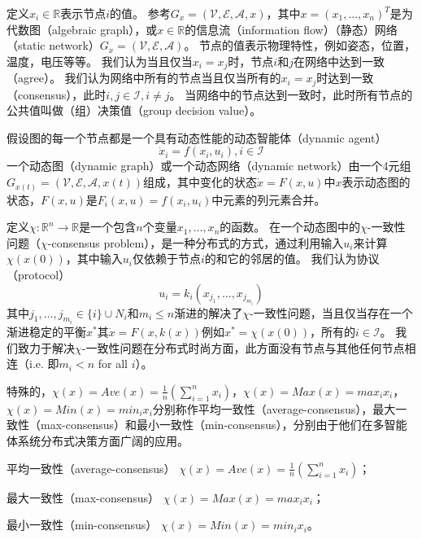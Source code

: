 \documentclass{article}
\begin{document}
定义$x_i\in \mathbb{R}$表示节点$i$的值。
参考$G_x=(\mathcal{V},\mathcal{E},\mathcal{A},x)$，其中$x=(x_1,...,x_n)^T$是为代数图（algebraic graph），或$x\in \mathbb{R}$的信息流（information flow）（静态）网络（static network）$G_x=(\mathcal{V},\mathcal{E},\mathcal{A})$。
节点的值表示物理特性，例如姿态，位置，温度，电压等等。
我们认为当且仅当$x_i=x_j$时，节点$i$和$j$在网络中达到一致（agree）。
我们认为网络中所有的节点当且仅当所有的$x_i=x_j$时达到一致（consensus），此时$i,j\in \mathcal{I}, i\ne j$。
当网络中的节点达到一致时，此时所有节点的公共值叫做（组）决策值（group decision value）。

假设图的每一个节点都是一个具有动态性能的动态智能体（dynamic agent）
\begin{equation}
    \dot{x}_i = f(x_i, u_i), i\in \mathcal{I}
    \tag{2}
    \label{2}
\end{equation}
一个动态图（dynamic graph）或一个动态网络（dynamic network）由一个4元组$G_{x(t)} = (\mathcal{V},\mathcal{E},\mathcal{A},x(t))$组成，其中变化的状态$\dot{x}=F(x,u)$中$x$表示动态图的状态，$F(x,u)$是$F_i(x,u)=f(x_i,u_i)$中元素的列元素合并。

定义$\chi: \mathbb{R}^n \rightarrow \mathbb{R}$是一个包含$n$个变量$x_1,\dots,x_n$的函数。
在一个动态图中的$\chi$-一致性问题（$\chi$-consensus problem），是一种分布式的方式，通过利用输入$u_i$来计算$\chi(x(0))$，其中输入$u_i$仅依赖于节点$i$的和它的邻居的值。
我们认为协议（protocol）
\begin{equation}
    u_i = k_i(x_{j_1},\dots,x_{j_{m_i}})
    \tag{3}
    \label{3}
\end{equation}
其中$j_1,\dots,j_{m_i}\in \{i\} \cup N_i$和$m_i\leq n$渐进的解决了$\chi$-一致性问题，当且仅当存在一个渐进稳定的平衡$x^*$其$\dot{x}=F(x,k(x))$例如$x^*=\chi(x(0))$，所有的$i\in \mathcal{I}$。
我们致力于解决$\chi$-一致性问题在分布式时尚方面，此方面没有节点与其他任何节点相连（i.e. 即$m_i < n$ for all $i$）。

特殊的，$\chi(x)=Ave(x)=\frac{1}{n}(\sum_{i=1}^{n}x_i)$，$\chi(x)=Max(x)=max_ix_i$，$\chi(x)=Min(x)=min_ix_i$分别称作平均一致性（average-consensus），最大一致性（max-consensus）和最小一致性（min-consensus），分别由于他们在多智能体系统分布式决策方面广阔的应用。

{\color{blue}
平均一致性（average-consensus）
$\chi(x)=Ave(x)=\frac{1}{n}(\sum_{i=1}^{n}x_i)$；

最大一致性（max-consensus）
$\chi(x)=Max(x)=max_ix_i$；

最小一致性（min-consensus）
$\chi(x)=Min(x)=min_ix_i$。
}
\end{document}
